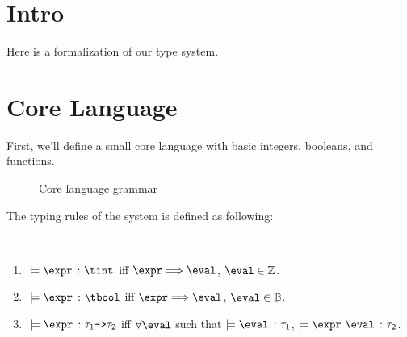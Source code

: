 \section{Intro}

Here is a formalization of our type system.

\section{Core Language}

First, we'll define a small core language with basic integers, booleans, and functions.

\begin{figure}[hbt!]%
  \begin{grammar}
            \grule[types]{\syntype}{
              \tint
              \gor \tbool
              \gor \tfun
          }
        \end{grammar}
    \caption{Core language grammar}
    \label{fig_Grammar}
\end{figure}

The typing rules of the system is defined as following:

\begin{definition}
  \label{def_typingRules}
  \ \par
  \begin{enumerate}
      \item $\ \models \hastype{\expr}{\tint}$ iff $\expr \bigstep \eval$, $\eval \in \mathbb{Z}$.
      \item $\ \models \hastype{\expr}{\tbool}$ iff $\expr \bigstep \eval$, $\eval \in \mathbb{B}$.
      \item $\ \models \hastype{\expr}{\mktfun{\tau_1}{\tau_2}}$ iff $\forall{\eval}$ such that $\models \hastype{\eval}{\tau_1}$, $\models \hastype{\expr\ \eval}{\tau_2}$.
   \end{enumerate}
\end{definition}